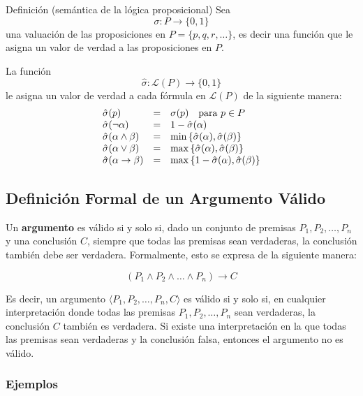 \begin{thmblock}{Definición (semántica de la lógica proposicional)}
    Sea $$\sigma \colon P \rightarrow \{0,1\}$$ una \alert{valuación} de las proposiciones en $P=\{p,q,r,\ldots\}$, es decir una función que le asigna un valor de verdad a las proposiciones en $P$.

    La función $$\hat{\sigma} \colon \mathcal{L}(P) \rightarrow \{0,1\}$$ le asigna un valor de verdad a cada fórmula en $\mathcal{L}(P)$ de la siguiente manera:
    $$
    \begin{array}{l c l}
        \hat{\sigma}(p) &=& \sigma(p) \quad \text{para } p \in P\\
        \hat{\sigma}(\lnot \alpha) &=& 1 - \hat{\sigma}(\alpha) \\
        \hat{\sigma}(\alpha \land \beta) &=& \min\,\{\hat{\sigma}(\alpha), \hat{\sigma}(\beta) \} \\
        \hat{\sigma}(\alpha \lor \beta) &=& \max\,\{\hat{\sigma}(\alpha), \hat{\sigma}(\beta) \} \\
        \hat{\sigma}(\alpha \rightarrow \beta) &=& \max\,\{1-\hat{\sigma}(\alpha), \hat{\sigma}(\beta) \}
    \end{array}
    $$
\end{thmblock}

\subsection{Definición Formal de un Argumento Válido}

Un \textbf{argumento} es válido si y solo si, dado un conjunto de premisas \( P_1, P_2, \dots, P_n \) y una conclusión \( C \), siempre que todas las premisas sean verdaderas, la conclusión también debe ser verdadera. Formalmente, esto se expresa de la siguiente manera:

\[
(P_1 \land P_2 \land \dots \land P_n) \rightarrow C
\]

Es decir, un argumento \( \langle P_1, P_2, \dots, P_n, C \rangle \) es válido si y solo si, en cualquier interpretación donde todas las premisas \( P_1, P_2, \dots, P_n \) sean verdaderas, la conclusión \( C \) también es verdadera. Si existe una interpretación en la que todas las premisas sean verdaderas y la conclusión falsa, entonces el argumento no es válido.

\subsubsection{Ejemplos}

